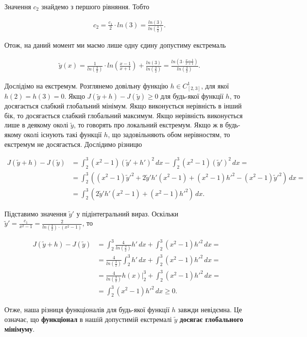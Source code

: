 \documentclass[12pt]{article}
\begin{document}
Значення $c_2$ знайдемо з першого рівняння. Тобто

\begin{align*}
  & c_2 = \frac{c_1}{2}\cdot ln(3) = \frac{ln(3)}{ln(\frac{3}{2})}.
\end{align*}

Отож, на даний момент ми маємо лише одну єдину допустиму екстремаль

\begin{align*}
  &\tilde{y}(x) = \frac{1}{ln(\frac{3}{2})}\cdot ln(\frac{x - 1}{x + 1}) + \frac{ln(3)}{ln(\frac{3}{2})} = \frac{ln(3 \cdot \frac{x - 1}{x + 1})}{ln(\frac{3}{2})}.
\end{align*}

Дослідімо на екстремум. Розглянемо довільну функцію $h \in C^{1}_{[2, 3]}$, для якої $h(2) = h(3) = 0$. Якщо $J(\tilde{y} + h) - J(\tilde{y}) \geq 0$ для будь-якої функції $h$, то досягається слабкий глобальний мінімум. Якщо виконується нерівність в інший бік, то досягається слабкий глобальний максимум. Якщо нерівність виконується лише в деякому околі $\tilde{y}$, то говорять про локальний екстремум. Якщо ж в будь-якому околі існують такі функції $h$, що задовільняють обом нерівностям, то екстремум не досягається. Дослідимо різницю

\begin{align*}
  J(\tilde{y} + h) - J(\tilde{y}) & = \int_{2}^{3}(x^2 - 1)(\tilde{y}' + h')^2 \,dx - \int_{2}^{3}(x^2 - 1)(\tilde{y}')^2 \,dx = \\
  & = \int_{2}^{3} ((x^2 - 1)\tilde{y}'^2 + 2\tilde{y}'h'(x^2 - 1) + (x^2 - 1)h'^2 - (x^2 - 1)\tilde{y}'^2) \, dx = \\
  & = \int_{2}^{3} (2\tilde{y}'h'(x^2 - 1) + (x^2 - 1)h'^2) \, dx.
\end{align*}

Підставимо значення $\tilde{y}'$ у підінтегральний вираз. Оскільки $\tilde{y}' = \frac{c_1}{x^2 - 1} = \frac{2}{ln(\frac{3}{2})\cdot (x^2 - 1)}$, то

\begin{align*}
  J(\tilde{y} + h) - J(\tilde{y}) & = \int_{2}^{3} \frac{4}{ln(\frac{3}{2})}h' \, dx + \int_{2}^{3} (x^2 - 1)h'^2 \, dx = \\
  & = \frac{4}{ln(\frac{3}{2})} \int_{2}^{3} h' \, dx + \int_{2}^{3} (x^2 - 1)h'^2 \, dx = \\
  & = \frac{4}{ln(\frac{3}{2})} h(x) \Big|_{2}^{3} + \int_{2}^{3} (x^2 - 1)h'^2 \, dx = \\
  & = \int_{2}^{3} (x^2 - 1)h'^2 \, dx \geq 0.
\end{align*}

Отже, наша різниця функціоналів для будь-якої функції $h$ завжди невід\textquotesingle ємна. Це означає, що \textbf{функціонал} в нашій допустимій екстремалі $\tilde{y}$ \textbf{досягає глобального мінімуму}.
\end{document}
